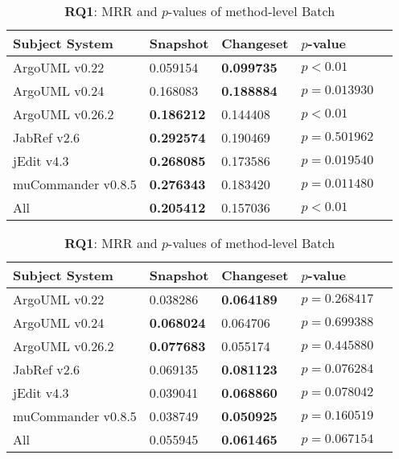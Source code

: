 \begin{table}[t]
\renewcommand{\arraystretch}{1.3}
\footnotesize
\centering
\caption{{\bf RQ1}: MRR and $p$-values of class-level Batch}
\begin{tabular}{l|ll|ll}
\toprule
Subject System     & Snapshot        & Changeset       & $p$-value  \\
\midrule
ArgoUML v0.22      & 0.059154        & {\bf 0.099735 } & $p < 0.01$ \\
ArgoUML v0.24      & 0.168083        & {\bf 0.188884 } & $p = 0.013930$ \\
ArgoUML v0.26.2    & {\bf 0.186212 } & 0.144408        & $p < 0.01$ \\
JabRef v2.6        & {\bf 0.292574 } & 0.190469        & $p = 0.501962$ \\
jEdit v4.3         & {\bf 0.268085 } & 0.173586        & $p = 0.019540$ \\
muCommander v0.8.5 & {\bf 0.276343 } & 0.183420        & $p = 0.011480$ \\
\midrule
All                & {\bf 0.205412 } & 0.157036        & $p < 0.01$ \\
\bottomrule
\end{tabular}
\vspace{3mm}
\label{table:rq1:class:lda}
\caption{{\bf RQ1}: MRR and $p$-values of method-level Batch}
\begin{tabular}{l|ll|ll}
\toprule
Subject System     & Snapshot        & Changeset       & $p$-value  \\
\midrule
ArgoUML v0.22      & 0.038286        & {\bf 0.064189 } & $p = 0.268417$ \\
ArgoUML v0.24      & {\bf 0.068024 } & 0.064706        & $p = 0.699388$ \\
ArgoUML v0.26.2    & {\bf 0.077683 } & 0.055174        & $p = 0.445880$ \\
JabRef v2.6        & 0.069135        & {\bf 0.081123 } & $p = 0.076284$ \\
jEdit v4.3         & 0.039041        & {\bf 0.068860 } & $p = 0.078042$ \\
muCommander v0.8.5 & 0.038749        & {\bf 0.050925 } & $p = 0.160519$ \\
\midrule
All                & 0.055945        & {\bf 0.061465 } & $p = 0.067154$ \\
\bottomrule
\end{tabular}
\label{table:rq1:method:lda}
\end{table}
